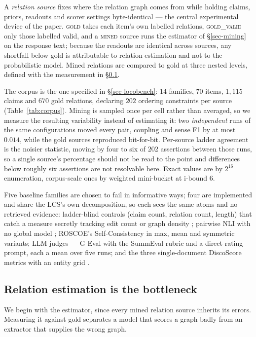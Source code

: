 A \emph{relation source} fixes where the relation graph comes from while holding claims, priors, readouts and scorer
settings byte-identical --- the central experimental device of the paper. \textsc{gold} takes each item's own
labelled relations, \textsc{gold\_valid} only those labelled valid, and a \textsc{mined} source runs the estimator
of \S\ref{sec-mining} on the response text; because the readouts are identical across sources, any shortfall below
gold is attributable to relation estimation and not to the probabilistic model. Mined relations are compared to
gold at three nested levels, defined with the measurement in \S\ref{sec-bottleneck}.

The corpus is the one specified in \S\ref{sec-locobench}: $14$ families, $70$ items, $1{,}115$ claims and
$670$ gold relations, declaring $202$ ordering constraints per source (Table~\ref{tab:corpus}). Mining is sampled
once per cell rather than averaged, so we measure the resulting variability instead of estimating it: two
\emph{independent} runs of the same configurations moved every pair, coupling and sense F1 by at most $0.014$,
while the gold sources reproduced bit-for-bit. Per-source ladder agreement is the noisier statistic, moving by four to
six of $202$ assertions between those runs, so a single source's percentage should not be read to the point and
differences below roughly six assertions are not resolvable here. Exact values are by $2^{16}$ enumeration,
corpus-scale ones by weighted mini-bucket \citep{wmb} at i-bound $6$.

Five baseline families are chosen to fail in informative ways; four are implemented and share the LCS's own
decomposition, so each sees the same atoms and no retrieved evidence: ladder-blind controls (claim count,
relation count, length) that catch a measure secretly tracking edit count or graph density
\citep{steenmarkert}; pairwise NLI with no global model \citep{selfcheckgpt}; ROSCOE's Self-Consistency
\citep{roscoe} in max, mean and symmetric variants; LLM judges --- G-Eval \citep{geval} with the SummEval
rubric \citep{summeval} and a direct rating prompt, each a mean over five runs; and the three single-document
DiscoScore metrics \citep{discoscore} with an entity grid \citep{barzilay}.

\subsection{Relation estimation is the bottleneck}
\label{sec-bottleneck}

We begin with the estimator, since every mined relation source inherits its errors. Measuring it against gold separates a
model that scores a graph badly from an extractor that supplies the wrong graph.

